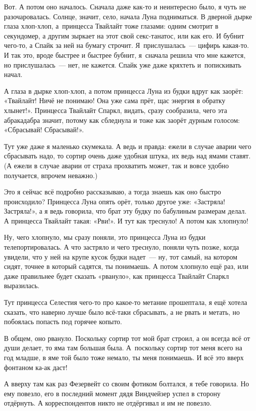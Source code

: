 \documentclass[fontsize=11pt,a5paper,titlepage=firstcover]{scrbook}
\begin{document}
Вот. А потом оно началось. Сначала даже как-то и неинтересно было, я чуть не разочаровалась. Солнце, значит, село, начала Луна подниматься. В дверной дырке глаза хлоп-хлоп, а~принцесса Твайлайт тоже глазами: одним смотрит в секундомер, а другим зыркает на этот свой секс-танатос, или как его. И бубнит чего-то, а Спайк за ней на бумагу строчит. Я~прислушалась~--- цифирь какая-то. И так это, вроде быстрее и быстрее бубнит, я~сначала решила что мне кажется, но прислушалась~--- нет, не кажется. Спайк уже даже кряхтеть и~попискивать начал.

А глаза в дырке хлоп-хлоп, а потом принцесса Луна из будки вдруг как заорёт: «Твайлайт! Ничё не понимаю! Она уже сама прёт, щас энергия в обратку хлынет!». Принцесса Твайлайт Спаркл, видать, сразу сообразила, чего эта абракадабра значит, потому как сбледнула и тоже как заорёт дурным голосом: «Сбрасывай! Сбрасывай!».

Тут уже даже я маленько скумекала. А ведь и правда: ежели в случае аварии чего сбрасывать надо, то сортир очень даже удобная штука, их ведь над ямами ставят. (А ежели в случае аварии от страха прохватить может, так и вовсе удобно получается, впрочем неважно.)

Это я сейчас всё подробно рассказываю, а тогда знаешь как оно быстро происходило? Принцесса Луна опять орёт, только другое уже: «Застряла! Застряла!», а я ведь говорила, что брат эту будку по бабулиным размерам делал. А принцесса Твайлайт такая: «Рви!». И тут как треснуло! А потом как хлопнуло!

Ну, чего хлопнуло, мы сразу поняли, это принцесса Луна из будки телепортировалась. А что застряло и чего треснуло, поняли чуть позже, когда увидели, что у ней на крупе кусок будки надет~--- ну, тот самый, на котором сидят, точнее в который садятся, ты понимаешь. А потом хлопнуло ещё раз, или даже правильнее будет сказать «рвануло», как принцесса Твайлайт Спаркл выразилась.

Тут принцесса Селестия чего-то про какое-то метание прошептала, я ещё хотела сказать, что наверно лучше было всё-таки сбрасывать, а не рвать и метать, но побоялась попасть под горячее копыто.

В общем, оно рвануло. Поскольку сортир тот мой брат строил, а он всегда всё от души делает, то яма там большая была. А~поскольку сортир тот меня всего на год младше, в яме той было тоже немало, ты меня понимаешь. И всё это вверх фонтаном ка-ак даст!

А вверху там как раз Фезервейт со своим фотиком болтался, я тебе говорила. Но ему повезло, его в последний момент дядя Виндчейзер успел в сторону отдёрнуть. А корреспондентов никто не отдёргивал и им не повезло.
\end{document}
